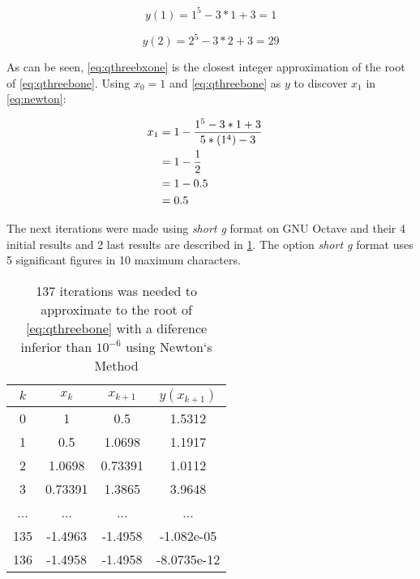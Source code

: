 		\begin{equation}
			y(1) = 1^5 - 3*1 + 3 = 1
		\label{eq:qthreebxone}
		\end{equation}

		\begin{equation}
			y(2) = 2^5 - 3*2 + 3 = 29
		\label{eq:qthreebxtwo}
		\end{equation}

		As can be seen, \cref{eq:qthreebxone} is the closest integer approximation of the root of \cref{eq:qthreebone}. Using $x_{0} = 1$ and \cref{eq:qthreebone} as $y$ to discover $x_{1}$ in \cref{eq:newton}:
	
		\begin{align}
			x_{1} &= 1 - \frac{1^5 - 3*1 + 3}{5*(1^4) - 3}& \notag \\
			&= 1 - \frac{1}{2}& \notag \\
			&= 1 - 0.5& \notag \\
			&= 0.5&
			\label{eq:qthreebxones}
		\end{align}

		The next iterations were made using \emph{short g} format on GNU Octave and their 4 initial results and 2 last results are described in \cref{tab:qthreeb}. The option \emph{short g} format uses 5 significant figures in 10 maximum characters.

		\begin{table}[H]
			\begin{center}
				\begin{tabular}{|c||c||c|c|}
					\hline
					\textbf{$k$} & \textbf{$x_{k}$} & \textbf{$x_{k+1}$} & \textbf{$y(x_{k+1})$} \\ \hline
					0 & 1 & 0.5 & 1.5312  \\ \hline
					1 & 0.5 & 1.0698 & 1.1917  \\ \hline
					2 & 1.0698 & 0.73391 & 1.0112  \\ \hline
					3 & 0.73391 & 1.3865 & 3.9648  \\ \hline
					... & ... & ... & ...  \\ \hline
					135 & -1.4963 & -1.4958 & -1.082e-05  \\ \hline
					136 & -1.4958 & -1.4958 & -8.0735e-12  \\ \hline
				\end{tabular}
				\caption{137 iterations was needed to approximate to the root of \cref{eq:qthreebone} with a diference inferior than $10^{-6}$ using Newton`s Method}
				\label{tab:qthreeb}
			\end{center}
		\end{table}